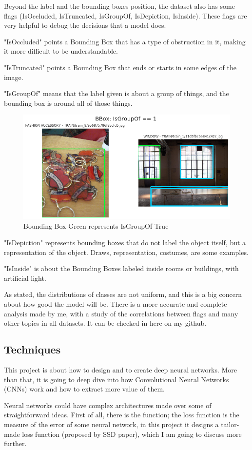 \documentclass[11pt, a4paper, twocolumn]{article}
\begin{document}
Beyond the label and the bounding boxes position, the dataset also has some flags (IsOccluded, IsTruncated, IsGroupOf, IsDepiction, IsInside). These flags are very helpful to debug the decisions that a model does.

"IsOccluded" points a Bounding Box that has a type of obstruction in it, making it more difficult to be understandable.

"IsTruncated" points a Bounding Box that ends or starts in some edges of the image.

"IsGroupOf" means that the label given is about a group of things, and the bounding box is around all of those things.

\begin{figure}[!ht]
	\centering
	\includegraphics[width=.5\textwidth]{isgroupof-true.png}
	\caption{\scriptsize Bounding Box Green represents IsGroupOf True }
\end{figure}

"IsDepiction" represents bounding boxes that do not label the object itself, but a representation of the object. Draws, representation, costumes, are some examples.

"IsInside" is about the Bounding Boxes labeled inside rooms or buildings, with artificial light.

As stated, the distributions of classes are not uniform, and this is a big concern about how good the model will be. There is a more accurate and complete analysis made by me, with a study of the correlations between flags and many other topics in all datasets. It can be checked in here \cite{eda} on my github.

\subsection{Techniques}

This project is about how to design and to create deep neural networks. More than that, it is going to deep dive into how Convolutional Neural Networks (CNNs) work and how to extract more value of them.

Neural networks could have complex architectures made over some of straightforward ideas. First of all, there is the  function; the loss function is the measure of the error of some neural network, in this project it designs a tailor-made loss function (proposed by SSD paper), which I am going to discuss more further.
\end{document}
